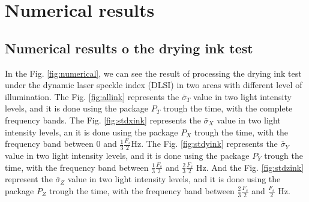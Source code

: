 \documentclass[review]{elsarticle}
\begin{document}
\section{Numerical results} 
\label{sec:numerical}

\subsection{Numerical results o the drying ink test} 
\label{subsec:numericalink}
In the Fig. \ref{fig:numerical}, we can see the result of processing 
 the drying ink test under the dynamic laser speckle index (DLSI) in two areas with different level of illumination. The Fig. \ref{fig:allink}
represents the $\bar{\sigma}_T$ value in two light intensity levels, and it is done using the package $P_T$
trough the time, with the complete frequency bands.
The Fig. \ref{fig:stdxink}
represents the $\bar{\sigma}_X$ value in two light intensity levels, an it is done using the package $P_X$
trough the time, with the frequency band between $0$ and $\frac{1}{3}\frac{F_s}{2}$Hz.
The Fig. \ref{fig:stdyink}
represents the $\bar{\sigma}_Y$ value in two light intensity levels, and it is done using the package $P_Y$
trough the time, with the frequency band between $\frac{1}{3}\frac{F_s}{2}$ and $\frac{2}{3}\frac{F_s}{2}$ Hz.
And the Fig. \ref{fig:stdzink}
represent the $\bar{\sigma}_Z$ value in two light intensity levels, and it is done using the package $P_Z$
trough the time, with the frequency band between $\frac{2}{3}\frac{F_s}{2}$ and $\frac{F_s}{2}$ Hz.
\end{document}
